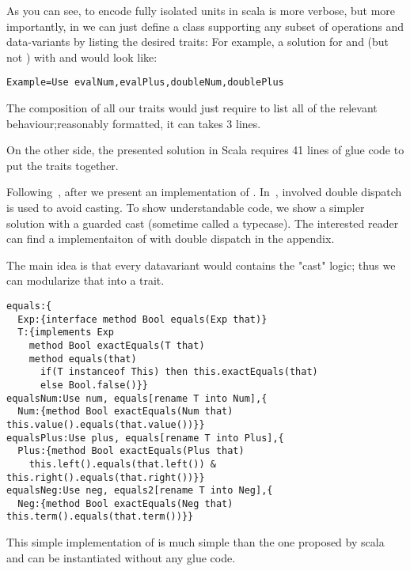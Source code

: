 As you can see, to encode fully isolated units in scala is
more verbose,
but more importantly,
in \name we can just define a class supporting any subset of operations
and data-variants by listing the desired traits:
For example, a solution for \Q@Num@ and \Q@Plus@ (but not \Q@Neg@)
with \Q@eval@ and \Q@double@ would look like:
\begin{lstlisting}
Example=Use evalNum,evalPlus,doubleNum,doublePlus
\end{lstlisting}
The composition of all our traits would just require to list all
of the relevant behaviour;reasonably formatted, it can takes 3 lines.

On the other side, the presented solution in Scala requires
41 lines of glue code to put the traits together.

Following~\cite{}, after \Q@double@ we present an implementation of \Q@equals@.
In~\cite{}, involved double dispatch is used to avoid casting.
To show understandable code, we show a simpler solution 
with a guarded cast (sometime called a typecase).
The interested reader can find a \name implementaiton of \Q@equals@ with double dispatch
in the appendix.

The main idea is that  every datavariant would contains
 the "cast" logic; thus
 we can modularize that into a \Q@expEquals@ trait.
\begin{lstlisting}
equals:{
  Exp:{interface method Bool equals(Exp that)}
  T:{implements Exp
    method Bool exactEquals(T that)
    method equals(that) 
      if(T instanceof This) then this.exactEquals(that)
      else Bool.false()}}
equalsNum:Use num, equals[rename T into Num],{
  Num:{method Bool exactEquals(Num that) this.value().equals(that.value())}}
equalsPlus:Use plus, equals[rename T into Plus],{
  Plus:{method Bool exactEquals(Plus that)
    this.left().equals(that.left()) & this.right().equals(that.right())}}
equalsNeg:Use neg, equals2[rename T into Neg],{
  Neg:{method Bool exactEquals(Neg that) this.term().equals(that.term())}}
\end{lstlisting}

This simple implementation of \Q@equals@
is much simple than the one proposed by scala
 and can be instantiated without any glue code.

